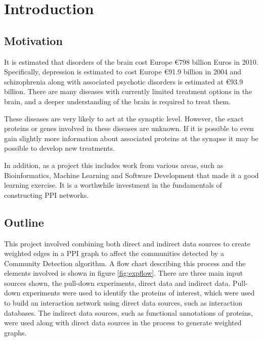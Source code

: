 \chapter{Introduction}
\label{introduction}



\section{Motivation}

It is estimated that disorders of the brain cost Europe €798 billion Euros in 2010\autocite{olesen_economic_2012}.
Specifically, depression is estimated to cost Europe €91.9 billion in 2004 and schizophrenia along with associated psychotic disorders is estimated at €93.9 billion.
There are many diseases with currently limited treatment options in the brain, and a deeper understanding of the brain is required to treat them.

These diseases are very likely to act at the synaptic level\autocites{chua_architecture_2010,synsys}.
However, the exact proteins or genes involved in these diseases are unknown.
If it is possible to even gain slightly more information about associated proteins at the synapse it may be possible to develop new treatments\autocite{li_interaction_2010}.

In addition, as a project this includes work from various areas, such as Bioinformatics, Machine Learning and Software Development that made it a good learning exercise.
It is a worthwhile investment in the fundamentals of constructing PPI networks.

\section{Outline}

This project involved combining both direct and indirect data sources to create weighted edges in a PPI graph to affect the communities detected by a Community Detection algorithm.
A flow chart describing this process and the elements involved is shown in figure \ref{fig:expflow}.
There are three main input sources shown, the pull-down experiments, direct data and indirect data.
Pull-down experiments were used to identify the proteins of interest, which were used to build an interaction network using direct data sources, such as interaction databases.
The indirect data sources, such as functional annotations of proteins, were used along with direct data sources in the process to generate weighted graphs.

